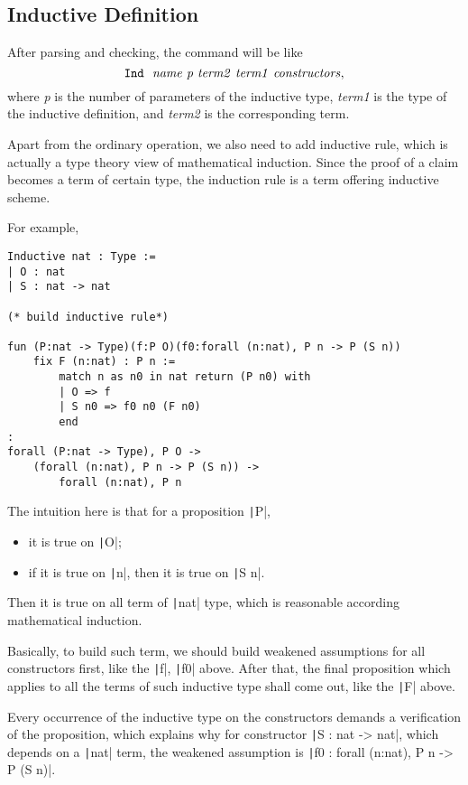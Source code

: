 \subsection{Inductive Definition}
After parsing and checking, the command will be like
$$
\tt Ind\ \ {\it name\ p\ term2\ term1\ constructors},
$$
where {\it p} is the number of parameters of the inductive type, {\it term1} is the type of the inductive definition,
and {\it term2} is the corresponding term.\par
Apart from the ordinary operation, we also need to add inductive rule, which is actually a type theory view of mathematical
induction. Since the proof of a claim becomes a term of certain type, the induction rule is a term offering inductive scheme.\par
For example,
\begin{center}
\begin{verbatim}
Inductive nat : Type := 
| O : nat
| S : nat -> nat

(* build inductive rule*)

fun (P:nat -> Type)(f:P O)(f0:forall (n:nat), P n -> P (S n))
    fix F (n:nat) : P n :=
        match n as n0 in nat return (P n0) with
        | O => f
        | S n0 => f0 n0 (F n0)
        end
:
forall (P:nat -> Type), P O -> 
    (forall (n:nat), P n -> P (S n)) ->
        forall (n:nat), P n
\end{verbatim}
\end{center}
The intuition here is that for a proposition \texttt|P|,
\begin{itemize}
\item it is true on \texttt|O|;
\item if it is true on \texttt|n|, then it is true on \texttt|S n|.
\end{itemize}
Then it is true on all term of \texttt|nat| type, which is reasonable according 
mathematical induction.\par
Basically, to build such term, we should build weakened assumptions for all constructors first, 
like the \texttt|f|,
\texttt|f0| above. After that, the final proposition which applies to all the terms of such inductive type
shall come out, like the \texttt|F| above.\par
Every occurrence of the inductive type on the constructors demands a verification of the proposition,
which explains why for constructor \texttt|S : nat -> nat|, which depends on a \texttt|nat| term, 
the weakened assumption is \texttt|f0 : forall (n:nat), P n -> P (S n)|.\par

